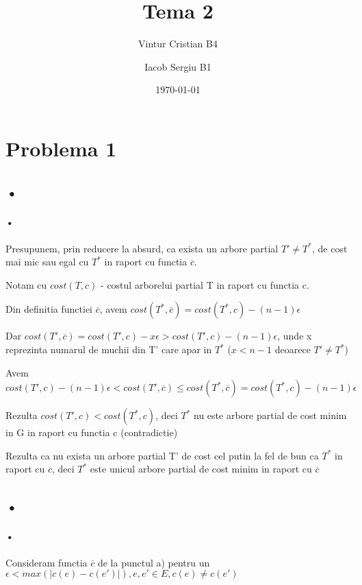 \documentclass[paper=a4, fontsize=11pt]{scrartcl}
\title{Tema 2}
\author{Vintur Cristian B4 \and Iacob Sergiu B1}
\date{\normalsize\today}
\begin{document}
\maketitle

\section{Problema 1}
\subsection{•}

\paragraph{•}
Presupunem, prin reducere la absurd, ca exista un arbore partial $T' \neq T^*$, de cost mai mic sau egal cu $T^*$ in raport cu functia $\overline{c}$.

Notam cu $cost(T, c)$ - costul arborelui partial T in raport cu functia c.

Din definitia functiei $\overline{c}$, avem $cost(T^*, \overline{c}) = cost(T^*, c) - (n - 1) \epsilon$

Dar $cost(T', \overline{c}) = cost(T', c) - x \epsilon > cost(T', c) - (n - 1) \epsilon$, unde x reprezinta numarul de muchii din T' care apar in $T^*$ ($x < n - 1$ deoarece $T' \neq T^*$)

Avem $cost(T', c) - (n - 1) \epsilon < cost(T', \overline{c}) \leqslant cost(T^*, \overline{c}) = cost(T^*, c) - (n - 1) \epsilon$

Rezulta $cost(T', c) < cost(T^*, c)$, deci $T^*$ nu este arbore partial de cost minim in G in raport cu functia c (contradictie)

Rezulta ca nu exista un arbore partial T' de cost cel putin la fel de bun ca $T^*$ in raport cu $\overline{c}$, deci $T^*$ este unicul arbore partial de cost minim in raport cu $\overline{c}$

\subsection{•}

\paragraph{•}
Consideram functia $\overline{c}$ de la punctul a) pentru un $\epsilon < max\left(\left|c(e)-c(e')\right|\right), e, e' \in E, c(e) \neq c(e')$
\end{document}
